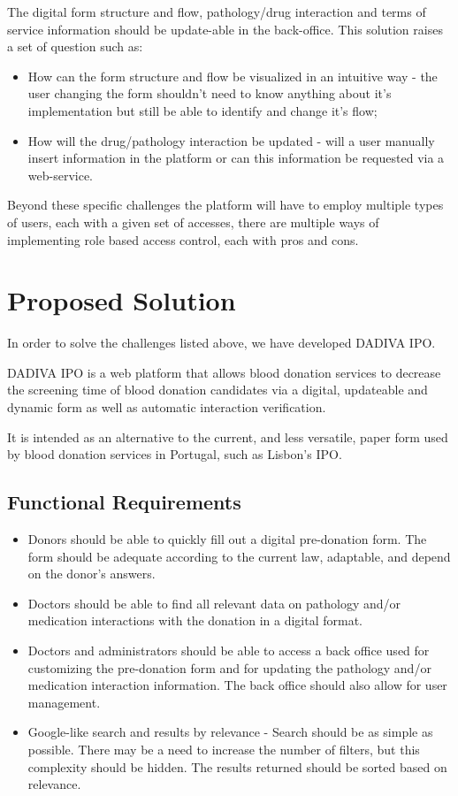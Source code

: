 The digital form structure and flow, pathology/drug interaction and terms of service information should be update-able in the back-office.
This solution raises a set of question such as:
\begin{itemize}
	\item How can the form structure and flow be visualized in an intuitive way - the user changing the form shouldn't need to know anything about it's implementation but still be able to identify and change it's flow;
	\item How will the drug/pathology interaction be updated - will a user manually insert information in the platform or can this information be requested via a web-service.
\end{itemize}

Beyond these specific challenges the platform will have to employ multiple types of users, each with a given set of accesses, there are multiple ways of implementing role based access control, each with pros and cons. 
\section{Proposed Solution}

In order to solve the challenges listed above, we have developed DADIVA IPO.

DADIVA IPO is a web platform that allows blood donation services to decrease the screening time of blood donation candidates via a digital, updateable and dynamic form as well as automatic interaction verification.

It is intended as an alternative to the current, and less versatile, paper form used by blood donation services in Portugal, such as Lisbon's IPO.

\subsection{Functional Requirements}
\begin{itemize}
	\item Donors should be able to quickly fill out a digital pre-donation form. The form should be adequate according to the current law, adaptable, and depend on the donor’s answers.
	
	\item Doctors should be able to find all relevant data on pathology and/or medication interactions with the donation in a digital format.
	
	\item Doctors and administrators should be able to access a back office used for customizing the pre-donation form and for updating the pathology and/or medication interaction information. The back office should also allow for user management.
	
	\item Google-like search and results by relevance - Search should be as simple as possible. There may be a need to increase the number of filters, but this complexity should be hidden. The results returned should be sorted based on relevance.
\end{itemize}

